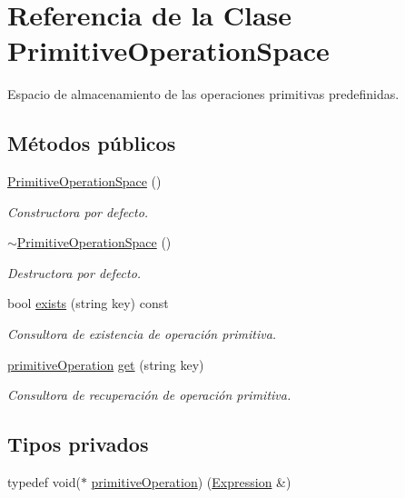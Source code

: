 \hypertarget{class_primitive_operation_space}{}\section{Referencia de la Clase Primitive\+Operation\+Space}
\label{class_primitive_operation_space}


Espacio de almacenamiento de las operaciones primitivas predefinidas.  


\subsection*{Métodos públicos}
\begin{DoxyCompactItemize}
\item 
\hyperlink{class_primitive_operation_space_a8213986669f4d655d23c73313d982b46}{Primitive\+Operation\+Space} ()
\begin{DoxyCompactList}\small\item\em Constructora por defecto. \end{DoxyCompactList}\item 
\hyperlink{class_primitive_operation_space_a76e59fa7a125f95689faa84d59f2e0d1}{$\sim$\+Primitive\+Operation\+Space} ()
\begin{DoxyCompactList}\small\item\em Destructora por defecto. \end{DoxyCompactList}\item 
bool \hyperlink{class_primitive_operation_space_ada17e99cdecb0f8113dfcdf11f4d9e38}{exists} (string key) const 
\begin{DoxyCompactList}\small\item\em Consultora de existencia de operación primitiva. \end{DoxyCompactList}\item 
\hyperlink{class_primitive_operation_space_a09c5a4b643964f8e61f797460dc6e765}{primitive\+Operation} \hyperlink{class_primitive_operation_space_abac38eedfb2f0acc93822a88fe2501ef}{get} (string key)
\begin{DoxyCompactList}\small\item\em Consultora de recuperación de operación primitiva. \end{DoxyCompactList}\end{DoxyCompactItemize}
\subsection*{Tipos privados}
\begin{DoxyCompactItemize}
\item 
typedef void($\ast$ \hyperlink{class_primitive_operation_space_a09c5a4b643964f8e61f797460dc6e765}{primitive\+Operation}) (\hyperlink{class_expression}{Expression} \&)
\end{DoxyCompactItemize}
